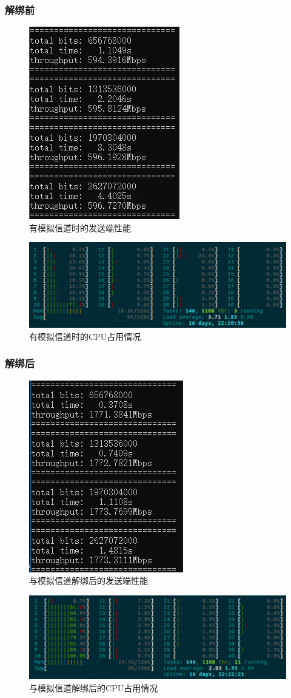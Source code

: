 \documentclass{article}
\begin{document}
\subsubsection{解绑前}
\begin{figure}[H]
	\centering
	\includegraphics[width = .4\textwidth]{txslow.png}
	\caption{有模拟信道时的发送端性能}
\end{figure}
\begin{figure}[H]
	\centering
	\includegraphics[width = .8\textwidth]{cpuslow.png}
	\caption{有模拟信道时的CPU占用情况}
\end{figure}
\subsubsection{解绑后}
\begin{figure}[H]
	\centering
	\includegraphics[width = .4\textwidth]{txfast.png}
	\caption{与模拟信道解绑后的发送端性能}
\end{figure}
\begin{figure}[H]
	\centering
	\includegraphics[width = .8\textwidth]{cpufast2.png}
	\caption{与模拟信道解绑后的CPU占用情况}
\end{figure}
\end{document}
